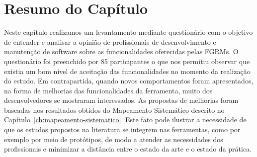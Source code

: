 \section{Resumo do Capítulo}
\label{sec:resumo_do_capitulo}

Neste capítulo realizamos um levantamento mediante questionário com o objetivo
de entender e analisar a opinião de profissionais de desenvolvimento e
manutenção de software sobre as funcionalidades oferecidas pelas FGRMs. O
questionário foi preenchido por 85 participantes o que nos permitiu observar que
existia um bom nível de aceitação das funcionalidades no momento da realização
do estudo. Em contrapartida, quando novos comportamentos foram apresentados, na
forma de melhorias das funcionalidades da ferramenta, muito dos desenvolvedores
se mostraram interessados. As propostas de melhorias foram baseadas nos
resultados obtidos do Mapeamento Sistemático descrito no
Capítulo~\ref{ch:mapeamento-sistematico}. Este fato pode ilustrar a necessidade
de que os estudos propostos na literatura se integrem nas ferramentas, como por
exemplo por meio de protótipos, de modo a atender as necessidades dos
profissionais e minimizar a distância entre o estado da arte e o estado da
prática.

